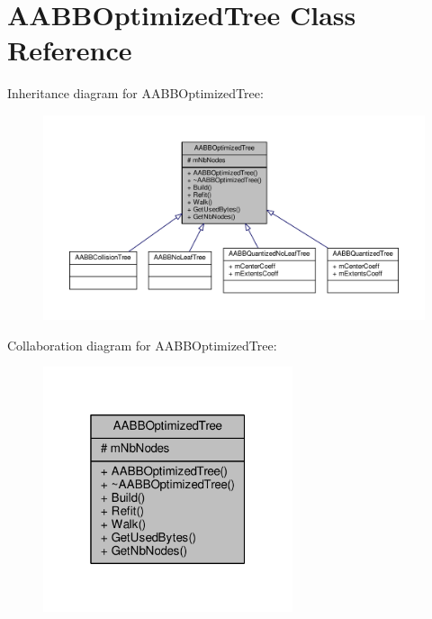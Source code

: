 \hypertarget{classAABBOptimizedTree}{}\section{A\+A\+B\+B\+Optimized\+Tree Class Reference}
\label{classAABBOptimizedTree}


Inheritance diagram for A\+A\+B\+B\+Optimized\+Tree\+:
\nopagebreak
\begin{figure}[H]
\begin{center}
\leavevmode
\includegraphics[width=350pt]{d4/d8a/classAABBOptimizedTree__inherit__graph}
\end{center}
\end{figure}


Collaboration diagram for A\+A\+B\+B\+Optimized\+Tree\+:
\nopagebreak
\begin{figure}[H]
\begin{center}
\leavevmode
\includegraphics[width=208pt]{dc/d9e/classAABBOptimizedTree__coll__graph}
\end{center}
\end{figure}
